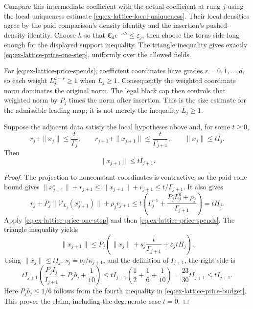 Compare this intermediate coefficient with the actual coefficient at rung
\(j\) using the local uniqueness estimate
\eqref{eq:ex-lattice-local-uniqueness}. Their local densities agree by the
paid comparison's density identity and the insertion's pushed-density
identity. Choose \(h\) so that
\(\mathfrak C_de^{-\sigma h}\leq\varepsilon_j\), then choose the torus
side long enough for the displayed support inequality. The triangle
inequality gives exactly \eqref{eq:ex-lattice-price-one-step}, uniformly
over the allowed fields.

For \eqref{eq:ex-lattice-price-spends}, coefficient coordinates have grades
\(r=0,1,\ldots,d\), so each weight \(L_j^{d-r}\geq1\) when \(L_j\geq1\).
Consequently the weighted coordinate norm dominates the original norm. The legal block cap
then controls that weighted norm by \(P_j\) times the norm after
insertion. This is the size estimate for the admissible leading map; it is
not merely the inequality \(L_j\geq1\).

\begin{lemma}
\label{lem:ex-lattice-price-one-step}
Suppose the adjacent data satisfy the local hypotheses above and, for some
\(t\geq0\),
\[
 r_j+\|x_j\|\leq\frac{t}{\Gamma_j},\qquad
 r_{j+1}+\|x_{j+1}\|\leq\frac{t}{\Gamma_{j+1}},\qquad
 \|x_j\|\leq tI_j.
\]
Then
\[
 \|x_{j+1}\|\leq tI_{j+1}.
\]
\end{lemma}

\begin{proof}
The projection to nonconstant coordinates is contractive, so the paid-cone
bound gives \(\|x_{j+1}^{\circ}\|+r_{j+1}\leq
\|x_{j+1}\|+r_{j+1}\leq t/\Gamma_{j+1}\). It also gives
\[
 r_j+P_j\|\mathcal V_{L_j}(x_{j+1}^{\circ})\|
       +\rho_jr_{j+1}
 \leq t\left(\Gamma_j^{-1}
        +\frac{P_jL_j^d+\rho_j}{\Gamma_{j+1}}\right)=tH_j.
\]
Apply \eqref{eq:ex-lattice-price-one-step} and then
\eqref{eq:ex-lattice-price-spends}. The triangle inequality yields
\[
 \|x_{j+1}\|
 \leq P_j\left(\|x_j\|
       +s_j\frac{t}{\Gamma_{j+1}}+\varepsilon_jtH_j\right).
\]
Using \(\|x_j\|\leq tI_j\), \(s_j=b_j/\kappa_{j+1}\), and the definition
of \(I_{j+1}\), the right side is
\[
 tI_{j+1}\left(
   \frac{P_jI_j}{I_{j+1}}
   +P_jb_j
   +\frac1{10}\right)
 \leq tI_{j+1}\left(\frac12+\frac16+\frac1{10}\right)
 =\frac{23}{30}tI_{j+1}\leq tI_{j+1}.
\]
Here \(P_jb_j\leq1/6\) follows from the fourth inequality in
\eqref{eq:ex-lattice-price-budget}. This proves the claim, including the
degenerate case \(t=0\).
\end{proof}

